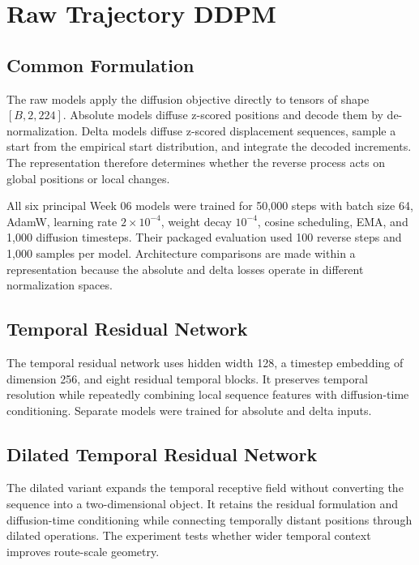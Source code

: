 \documentclass[12pt,a4paper,oneside]{report}
\begin{document}
\section{Raw Trajectory DDPM}

\subsection{Common Formulation}

The raw models apply the diffusion objective directly to tensors of shape $[B,2,224]$. Absolute models diffuse z-scored positions and decode them by de-normalization. Delta models diffuse z-scored displacement sequences, sample a start from the empirical start distribution, and integrate the decoded increments. The representation therefore determines whether the reverse process acts on global positions or local changes.

All six principal Week 06 models were trained for 50,000 steps with batch size 64, AdamW, learning rate $2\times10^{-4}$, weight decay $10^{-4}$, cosine scheduling, EMA, and 1,000 diffusion timesteps. Their packaged evaluation used 100 reverse steps and 1,000 samples per model. Architecture comparisons are made within a representation because the absolute and delta losses operate in different normalization spaces.

\subsection{Temporal Residual Network}

The temporal residual network uses hidden width 128, a timestep embedding of dimension 256, and eight residual temporal blocks. It preserves temporal resolution while repeatedly combining local sequence features with diffusion-time conditioning. Separate models were trained for absolute and delta inputs.

\subsection{Dilated Temporal Residual Network}

The dilated variant expands the temporal receptive field without converting the sequence into a two-dimensional object. It retains the residual formulation and diffusion-time conditioning while connecting temporally distant positions through dilated operations. The experiment tests whether wider temporal context improves route-scale geometry.
\end{document}
